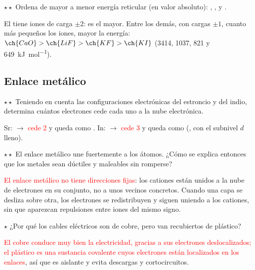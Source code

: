 \begin{exercise}
    \(\star\star\) Ordena de mayor a menor energía reticular (en valor absoluto): , ,  y .
    \begin{solu}
        El  tiene iones de carga \(\pm 2\): es el mayor. Entre los demás, con cargas \(\pm 1\), cuanto más pequeños los
        iones, mayor la energía: \textcolor{red}{\(\ch{CaO} > \ch{LiF} > \ch{KF} > \ch{KI}\)} (\num{3414}, \num{1037}, 821 y
        \qty{649}{\kilo\joule\per\mol}).
    \end{solu}
\end{exercise}

\subsection{Enlace metálico}

\begin{exercise}
    \(\star\star\) Teniendo en cuenta las configuraciones electrónicas del estroncio y del indio, determina cuántos electrones
    cede cada uno a la nube electrónica.
    \begin{solu}
        Sr:  \(\rightarrow\) \textcolor{red}{cede 2} y queda como . In: 
        \(\rightarrow\) \textcolor{red}{cede 3} y queda como  (, con el subnivel \(d\) lleno).
    \end{solu}
\end{exercise}

\begin{exercise}
    \(\star\star\) El enlace metálico une fuertemente a los átomos. ¿Cómo se explica entonces que los metales sean dúctiles y
    maleables sin romperse?
    \begin{solu}
        \textcolor{red}{El enlace metálico no tiene direcciones fijas}: los cationes están unidos a la nube de electrones en su
        conjunto, no a unos vecinos concretos. Cuando una capa se desliza sobre otra, los electrones se redistribuyen y siguen
        uniendo a los cationes, sin que aparezcan repulsiones entre iones del mismo signo.
    \end{solu}
\end{exercise}

\begin{exercise}
    \(\star\) ¿Por qué los cables eléctricos son de cobre, pero van recubiertos de plástico?
    \begin{solu}
        \textcolor{red}{El cobre conduce muy bien la electricidad, gracias a sus electrones deslocalizados; el plástico es una
        sustancia covalente cuyos electrones están localizados en los enlaces}, así que es aislante y evita descargas y
        cortocircuitos.
    \end{solu}
\end{exercise}

